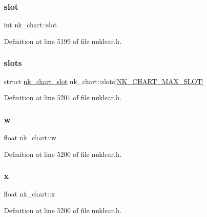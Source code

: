 \subsubsection{\texorpdfstring{slot}{slot}}
{\footnotesize\ttfamily int nk\+\_\+chart\+::slot}



Definition at line 5199 of file nuklear.\+h.

\mbox{\label{structnk__chart_abd217868acd2a20d1ff27914156573ac}} 
\subsubsection{\texorpdfstring{slots}{slots}}
{\footnotesize\ttfamily struct \mbox{\hyperlink{structnk__chart__slot}{nk\+\_\+chart\+\_\+slot}} nk\+\_\+chart\+::slots\mbox{[}\mbox{\hyperlink{nuklear_8h_acb2e713edfb3e50211b1fd67d38529be}{N\+K\+\_\+\+C\+H\+A\+R\+T\+\_\+\+M\+A\+X\+\_\+\+S\+L\+OT}}\mbox{]}}



Definition at line 5201 of file nuklear.\+h.

\mbox{\label{structnk__chart_acc9a21d99c3d518b74e736a0bee2f699}} 
\subsubsection{\texorpdfstring{w}{w}}
{\footnotesize\ttfamily float nk\+\_\+chart\+::w}



Definition at line 5200 of file nuklear.\+h.

\mbox{\label{structnk__chart_a62ce20cad6ebcb59d5d7a5033fb0cdbc}} 
\subsubsection{\texorpdfstring{x}{x}}
{\footnotesize\ttfamily float nk\+\_\+chart\+::x}



Definition at line 5200 of file nuklear.\+h.

\mbox{\label{structnk__chart_ab412562c43ee5deec5ae0527325089f4}} 
